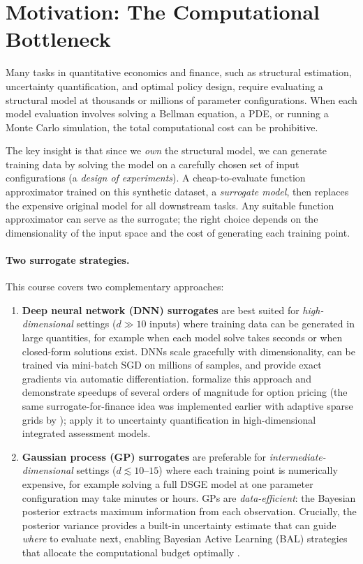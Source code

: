 \documentclass[11pt,a4paper]{report}
\begin{document}
\section{Motivation: The Computational Bottleneck}

Many tasks in quantitative economics and finance, such as structural estimation, uncertainty quantification, and optimal policy design, require evaluating a structural model at thousands or millions of parameter configurations.  When each model evaluation involves solving a Bellman equation, a PDE, or running a Monte Carlo simulation, the total computational cost can be prohibitive.

The key insight is that since we \emph{own} the structural model, we can generate training data by solving the model on a carefully chosen set of input configurations (a \emph{design of experiments}).  A cheap-to-evaluate function approximator trained on this synthetic dataset, a \emph{surrogate model}, then replaces the expensive original model for all downstream tasks.  Any suitable function approximator can serve as the surrogate; the right choice depends on the dimensionality of the input space and the cost of generating each training point.

\paragraph{Two surrogate strategies.}  This course covers two complementary approaches:

\begin{enumerate}[itemsep=3pt]
\item \textbf{Deep neural network (DNN) surrogates} are best suited for \emph{high-dimensional} settings ($d \gg 10$ inputs) where training data can be generated in large quantities, for example when each model solve takes seconds or when closed-form solutions exist.  DNNs scale gracefully with dimensionality, can be trained via mini-batch SGD on millions of samples, and provide exact gradients via automatic differentiation.  \citet{chen2025Deep} formalize this approach and demonstrate speedups of several orders of magnitude for option pricing (the same surrogate-for-finance idea was implemented earlier with adaptive sparse grids by \citet{scheideggertreccani_2018}); \citet{friedlDeep2023} apply it to uncertainty quantification in high-dimensional integrated assessment models.

\item \textbf{Gaussian process (GP) surrogates} are preferable for \emph{intermediate-dimensional} settings ($d \lesssim 10$--$15$) where each training point is numerically expensive, for example solving a full DSGE model at one parameter configuration may take minutes or hours.  GPs are \emph{data-efficient}: the Bayesian posterior extracts maximum information from each observation.  Crucially, the posterior variance provides a built-in uncertainty estimate that can guide \emph{where} to evaluate next, enabling Bayesian Active Learning (BAL) strategies that allocate the computational budget optimally \citep{SCHEIDEGGER201968}.
\end{enumerate}
\end{document}
